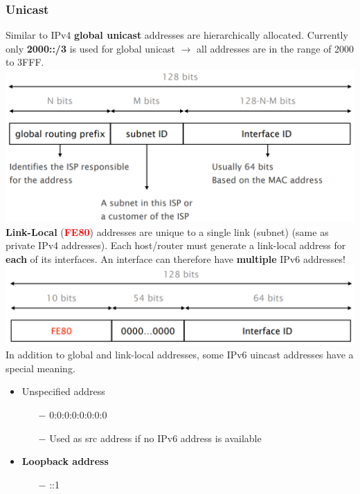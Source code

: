 \documentclass[a4paper, fontsize=8pt, landscape, DIV=1]{scrartcl}
\begin{document}
\begin{multicols*}{4}
		\subsubsection{Unicast}
		Similar to IPv4 \textbf{global unicast} addresses are hierarchically allocated.
		Currently only \textbf{2000::/3} is used for global unicast $\rightarrow$ all
		addresses are in the range of 2000 to 3FFF.\\
		\includegraphics[width=\columnwidth]{images/Network_Layer/v6_unicast.png}
		\textbf{Link-Local} (\textcolor{Red}{\textbf{FE80}}) addresses are unique to a single link (subnet) (same as
		private IPv4 addresses). Each host/router must generate a link-local address for
		\textbf{each} of its interfaces. An interface can therefore have
		\textbf{multiple} IPv6 addresses!\\
		\includegraphics[width=\columnwidth]{images/Network_Layer/v6_link_local.png} 
		In addition to global and link-local addresses, some IPv6 uincast addresses
		have a special meaning.
		\vspace{2cm}
		\begin{itemize}[noitemsep]
			\item Unspecified address
			\begin{itemize}
				\item[$-$] 0:0:0:0:0:0:0:0
				\item[$-$] Used as src address if no IPv6 address is available
			\end{itemize}
			\item \textbf{Loopback address} 
			\begin{itemize}
				\item[$-$] ::1

\end{itemize}
\end{itemize}
\end{multicols*}
\end{document}
